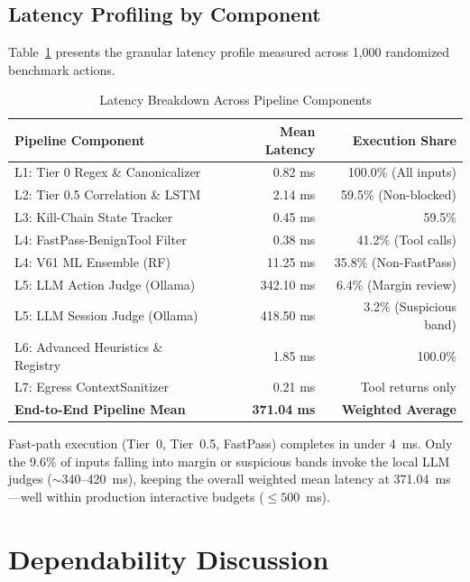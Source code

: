 \documentclass[conference]{IEEEtran}
\begin{document}
\subsection{Latency Profiling by Component}
Table~\ref{tab:latency} presents the granular latency profile measured across 1,000 randomized benchmark actions.

\begin{table}[t]
\caption{Latency Breakdown Across Pipeline Components}
\label{tab:latency}
\centering
\begin{tabular}{lrr}
\toprule
\textbf{Pipeline Component} & \textbf{Mean Latency} & \textbf{Execution Share} \\
\midrule
L1: Tier 0 Regex \& Canonicalizer & 0.82 ms & 100.0\% (All inputs) \\
L2: Tier 0.5 Correlation \& LSTM & 2.14 ms & 59.5\% (Non-blocked) \\
L3: Kill-Chain State Tracker & 0.45 ms & 59.5\% \\
L4: FastPass-BenignTool Filter & 0.38 ms & 41.2\% (Tool calls) \\
L4: V61 ML Ensemble (RF) & 11.25 ms & 35.8\% (Non-FastPass) \\
L5: LLM Action Judge (Ollama) & 342.10 ms & 6.4\% (Margin review) \\
L5: LLM Session Judge (Ollama) & 418.50 ms & 3.2\% (Suspicious band) \\
L6: Advanced Heuristics \& Registry & 1.85 ms & 100.0\% \\
L7: Egress ContextSanitizer & 0.21 ms & Tool returns only \\
\midrule
\textbf{End-to-End Pipeline Mean} & \textbf{371.04 ms} & \textbf{Weighted Average} \\
\bottomrule
\end{tabular}
\end{table}

Fast-path execution (Tier~0, Tier~0.5, FastPass) completes in under 4~ms. Only the 9.6\% of inputs falling into margin or suspicious bands invoke the local LLM judges ($\sim$340--420~ms), keeping the overall weighted mean latency at 371.04~ms---well within production interactive budgets ($\leq 500$~ms).

\section{Dependability Discussion}
\end{document}
